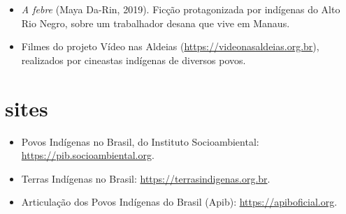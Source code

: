 \begin{itemize}
\item \textit{A febre} (Maya Da-Rin, 2019). Ficção protagonizada por
indígenas do Alto Rio Negro, sobre um trabalhador desana que vive em
Manaus.
\item Filmes do projeto Vídeo nas Aldeias
(\url{https://videonasaldeias.org.br}), realizados por cineastas
indígenas de diversos povos.
\end{itemize}

\section{sites}

\begin{itemize}
\item Povos Indígenas no Brasil, do Instituto Socioambiental:
\url{https://pib.socioambiental.org}.
\item Terras Indígenas no Brasil: \url{https://terrasindigenas.org.br}.
\item Articulação dos Povos Indígenas do Brasil (Apib):
\url{https://apiboficial.org}.
\end{itemize}
\endgroup

